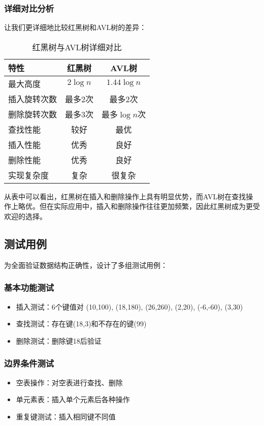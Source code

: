 \documentclass[12pt,a4paper]{article}
\begin{document}
\subsubsection{详细对比分析}
让我们更详细地比较红黑树和AVL树的差异：

\begin{table}[h]
\centering
\caption{红黑树与AVL树详细对比}
\begin{tabular}{|l|c|c|}
\hline
特性 & 红黑树 & AVL树 \\
\hline
最大高度 & $2\log n$ & $1.44 \log n$ \\
插入旋转次数 & 最多2次 & 最多2次 \\
删除旋转次数 & 最多3次 & 最多$\log n$次 \\
查找性能 & 较好 & 最优 \\
插入性能 & 优秀 & 良好 \\
删除性能 & 优秀 & 良好 \\
实现复杂度 & 复杂 & 很复杂 \\
\hline
\end{tabular}
\end{table}

从表中可以看出，红黑树在插入和删除操作上具有明显优势，而AVL树在查找操作上略优。但在实际应用中，插入和删除操作往往更加频繁，因此红黑树成为更受欢迎的选择。
\subsection{测试用例}
为全面验证数据结构正确性，设计了多组测试用例：

\subsubsection{基本功能测试}
\begin{itemize}
\item 插入测试：6个键值对 (10,100), (18,180), (26,260), (2,20), (-6,-60), (3,30)
\item 查找测试：存在键(18,3)和不存在的键(99)
\item 删除测试：删除键18后验证
\end{itemize}

\subsubsection{边界条件测试}
\begin{itemize}
\item 空表操作：对空表进行查找、删除
\item 单元素表：插入单个元素后各种操作
\item 重复键测试：插入相同键不同值
\end{itemize}
\end{document}
